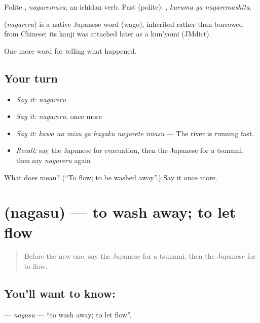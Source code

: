 Polite \textbf{}, \emph{nagaremasu}; an ichidan verb. Past (polite): \textbf{ }, \emph{kuruma ga nagaremashita}.

\begin{cousinweb}
\textbf{} (\emph{nagareru}) is a native Japanese word (wago), inherited rather than borrowed from Chinese; its kanji was attached later as a kun'yomi (JMdict).
\end{cousinweb}

\begin{grammarlens}[title={What you've built}]
One more word for telling what happened.
\end{grammarlens}

\subsection*{Your turn}
\begin{itemize}
\raggedright
  \item \emph{Say it:} \emph{nagareru}
  \item \emph{Say it:} \emph{nagareru}, once more
  \item \emph{Say it:} \emph{kawa no mizu ga hayaku nagarete imasu} — The river is running fast.
  \item \emph{Recall:} say the Japanese for evacuation, then the Japanese for a tsunami, then say \emph{nagareru} again
\end{itemize}

\begin{tcolorbox}[breakable,colback=teal!4,colframe=teal!35!black,title={Before you move on}]
What does  mean? (\textquotedblleft{}To flow; to be washed away\textquotedblright{}.) Say it once more.
\end{tcolorbox}
\section[\texorpdfstring{\ja{ながす} (nagasu)}{ながす (nagasu)}]{ (nagasu) — to wash away; to let flow}

\label{lesson:JA-C275-nagasu}



\begin{quote}
Before the new one: say the Japanese for a tsunami, then the Japanese for to flow.
\end{quote}

\subsection*{You'll want to know: }
\textbf{} — \emph{nagasu} — \textquotedblleft{}to wash away; to let flow\textquotedblright{}.

